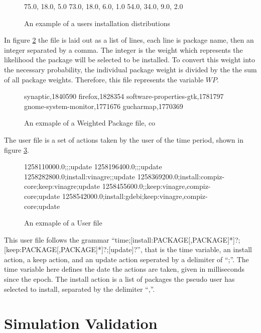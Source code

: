 \begin{figure}[htp]
\begin{center}
75.0, 18.0, 5.0
73.0, 18.0, 6.0, 1.0
54.0, 34.0, 9.0, 2.0
\caption[Install Distribution Example File]{An example of a users installation distributions}
\label{userprob}
\end{center}
\end{figure}

In figure \ref{packageprob} the file is laid out as a list of lines, each line is package name, then an integer separated by a comma.
The integer is the weight which represents the likelihood the package will be selected to be installed.
To convert this weight into the necessary probability, the individual package weight is divided by the the sum of all package weights. 
Therefore, this file represents the variable $WP$.

\begin{figure}[htp]
\begin{center}
synaptic,1840590
firefox,1828354
software-properties-gtk,1781797
gnome-system-monitor,1771676
gucharmap,1770369
\caption[Weighted Package File Example]{An exmaple of a Weighted Package file, co }
\label{packageprob}
\end{center}
\end{figure}

The user file is a set of actions taken by the user of the time period, shown in figure \ref{userfile}.

\begin{figure}[htp]
\begin{center}
1258110000.0;;;update
1258196400.0;;;update
1258282800.0;install:vinagre;;update
1258369200.0;install:compiz-core;keep:vinagre;update
1258455600.0;;keep:vinagre,compiz-core;update
1258542000.0;install:gdebi;keep:vinagre,compiz-core;update
  \caption[User File example]{An exmaple of a User file}
  \label{userfile}
\end{center}
\end{figure}

This user file follows the grammar ``time;[install:PACKAGE[,PACKAGE]*]?;[keep:PACKAGE[,PACKAGE]*]?;[update]?'',
that is the time variable, an install action, a keep action, and an update action seperated by a delimiter of ``;''.
The time variable here defines the date the actions are taken, given in milliseconds since the epoch.
The install action is a list of packages the pseudo user has selected to install, separated by the delimiter ``,''. 


\section{Simulation Validation}

